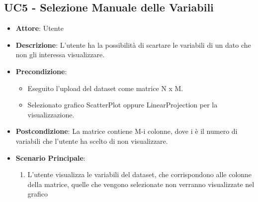     \subsection{UC5 - Selezione Manuale delle Variabili}
    \begin{itemize}
    \item \textbf{Attore}: Utente
    \item \textbf{Descrizione}: L'utente ha la possibilità di scartare le variabili di un dato che non gli interessa visualizzare.
    \item \textbf{Precondizione}: 
     \begin{itemize}
        \item Eseguito l'upload del dataset come matrice N x M.
        \item Selezionato grafico ScatterPlot oppure LinearProjection per la visualizzazione.
    \end{itemize}
    \item \textbf{Postcondizione}: La matrice contiene M-i colonne, dove i è il numero di variabili che l'utente ha scelto di non visualizzare.
    \item \textbf{Scenario Principale}: 
    \begin{enumerate}
        \item L'utente visualizza le variabili del dataset, che corrispondono alle colonne della matrice, quelle che vengono selezionate non verranno visualizzate nel grafico
    \end{enumerate}  
    \end{itemize}
    

